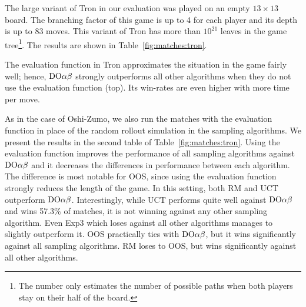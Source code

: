 The large variant of Tron in our evaluation was played on an empty $13\times 13$ board. The branching factor of this game is up to 4 for each player and its depth is up to 83 moves. This variant of Tron has more than $10^{21}$ leaves in the game tree\footnote{The number only estimates the number of possible paths when both players stay on their half of the board.}.
The results are shown in Table~\ref{fig:matches:tron}.

The evaluation function in Tron approximates the situation in the game fairly well; hence, $\textrm{DO}\alpha\beta$ strongly outperforms all other algorithms when they do not use the evaluation function (top). Its win-rates are even higher with more time per move.


As in the case of Oshi-Zumo, we also run the matches with the evaluation function in place of the random rollout simulation in the sampling algorithms.
We present the results in the second table of Table~\ref{fig:matches:tron}.
Using the evaluation function improves the performance of all sampling algorithms against $\textrm{DO}\alpha\beta$ and it decreases the differences in performance between each algorithm.
The difference is most notable for OOS, since using the evaluation function strongly reduces the length of the game.
In this setting, both RM and UCT outperform $\textrm{DO}\alpha\beta$. 
Interestingly, while UCT performs quite well against $\textrm{DO}\alpha\beta$ and wins 57.3\% of matches, it is not winning against any other sampling algorithm. 
Even Exp3 which loses against all other algorithms manages to slightly outperform it.
OOS practically ties with $\textrm{DO}\alpha\beta$, but it wins significantly against all sampling algorithms.
RM loses to OOS, but wins significantly against all other algorithms.

